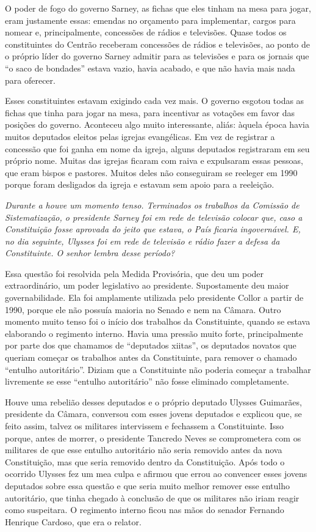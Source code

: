 O poder de fogo do governo Sarney, as fichas que
eles tinham na mesa para jogar, eram justamente essas: emendas no
orçamento para implementar, cargos para nomear e, principalmente,
concessões de rádios e televisões. Quase todos os constituintes do
Centrão receberam concessões de rádios e televisões, ao ponto de o
próprio líder do governo Sarney admitir para as televisões e para os
jornais que ``o saco de bondades'' estava vazio, havia acabado, e que
não havia mais nada para oferecer.

Esses constituintes estavam exigindo cada vez mais. O governo esgotou
todas as fichas que tinha para jogar na mesa, para incentivar as
votações em favor das posições do governo. Aconteceu algo muito
interessante, aliás: àquela época havia muitos deputados eleitos pelas
igrejas evangélicas. Em vez de registrar a concessão que foi ganha em
nome da igreja, alguns deputados registraram em seu próprio nome. Muitas
das igrejas ficaram com raiva e expulsaram essas pessoas, que eram
bispos e pastores. Muitos deles não conseguiram se reeleger em 1990
porque foram desligados da igreja e estavam sem apoio para a reeleição.

\medskip

\noindent\emph{Durante a  houve um momento tenso. Terminados os trabalhos da
Comissão de Sistematização, o presidente Sarney foi em rede de televisão
colocar que, caso a Constituição fosse aprovada do jeito que estava, o
País ficaria ingovernável. E, no dia seguinte, Ulysses foi em rede de
televisão e rádio fazer a defesa da Constituinte. O senhor lembra desse
período?}

Essa questão foi resolvida pela Medida Provisória,
que deu um poder extraordinário, um poder legislativo ao presidente.
Supostamente deu maior governabilidade. Ela foi amplamente utilizada
pelo presidente Collor a partir de 1990, porque ele não possuía maioria
no Senado e nem na Câmara. Outro momento muito tenso foi o início dos
trabalhos da Constituinte, quando se estava elaborando o regimento
interno. Havia uma pressão muito forte, principalmente por parte dos que
chamamos de ``deputados xiitas'', os deputados novatos que queriam
começar os trabalhos antes da Constituinte, para remover o chamado
``entulho autoritário''. Diziam que a Constituinte não poderia começar a
trabalhar livremente se esse ``entulho autoritário'' não fosse eliminado
completamente.

Houve uma rebelião desses deputados e o próprio deputado Ulysses
Guimarães, presidente da Câmara, conversou com esses jovens deputados e
explicou que, se feito assim, talvez os militares intervissem e
fechassem a Constituinte. Isso porque, antes de morrer, o presidente
Tancredo Neves se comprometera com os militares de que esse entulho
autoritário não seria removido antes da nova Constituição, mas que seria
removido dentro da Constituição. Após todo o ocorrido Ulysses fez um mea
culpa e afirmou que errou ao convencer esses jovens deputados sobre essa
questão e que seria muito melhor remover esse entulho autoritário, que
tinha chegado à conclusão de que os militares não iriam reagir como
suspeitara. O regimento interno ficou nas mãos do senador Fernando
Henrique Cardoso, que era o relator.

